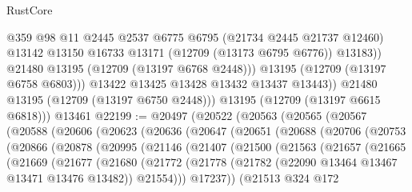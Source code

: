 \begin{lexlean}{RustCore}
\begin{coremodule}
                    @359
                    @98
                    @11
                    @2445
                    @2537
                    @6775
                    @6795
                    (@21734 @2445 @21737 @12460)
                    @13142
                    @13150
                    @16733
                    @13171
                    (@12709 (@13173 @6795 @6776))
                    @13183))
                @21480
                @13195
                (@12709 (@13197 @6768 @2448)))
              @13195
              (@12709 (@13197 @6758 @6803)))
            @13422
            @13425
            @13428
            @13432
            @13437
            @13443))
        @21480
        @13195
        (@12709 (@13197 @6750 @2448)))
      @13195
      (@12709 (@13197 @6615 @6818)))
    @13461
@22199 := @20497
    (@20522
      (@20563
        (@20565
          (@20567
            (@20588
              (@20606
                (@20623
                  (@20636
                    (@20647
                      (@20651
                        (@20688
                          (@20706
                            (@20753
                              (@20866
                                (@20878
                                  (@20995
                                    (@21146
                                      (@21407
                                        (@21500
                                          (@21563
                                            (@21657
                                              (@21665
                                                (@21669
                                                  (@21677
                                                    (@21680
                                                      (@21772
                                                        (@21778
                                                          (@21782
                                                            (@22090
                                                              @13464
                                                              @13467
                                                              @13471
                                                              @13476
                                                              @13482))
                                                          @21554)))
                                                    @17237))
                                                (@21513
                                                  @324
                                                  @172

\end{coremodule}
\end{lexlean}
